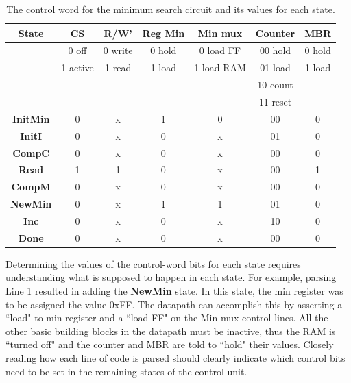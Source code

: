 \begin{table}
\begin{tabular}{c||c|c|c|c|c|c}  
{\bf State}   & CS       & R/W'   &  Reg Min  & Min mux       & Counter & MBR	\\ \hline
        & 0 off    & 0 write&  0 hold   & 0 load FF     & 00 hold & 0 hold	\\ \hline
        & 1 active & 1 read &  1 load   & 1 load RAM    & 01 load & 1 load	\\ \hline
        &          &        &           &               & 10 count& 		\\ \hline
        &          &        &           &               & 11 reset& \\ \hline \hline
{\bf InitMin } & 0        &    x   & 1         & 0             & 00      & 0   \\ \hline
{\bf InitI }  & 0        &    x   & 0         & x             & 01      & 0   \\ \hline
{\bf CompC }  & 0        &    x   & 0         & x             & 00      & 0   \\ \hline
{\bf Read  }  & 1        &    1   & 0         & x             & 00      & 1   \\ \hline
{\bf CompM }  & 0        &    x   & 0         & x             & 00      & 0   \\ \hline
{\bf NewMin }  & 0        &    x   & 1         & 1             & 01      & 0   \\ \hline
{\bf Inc  }   & 0        &    x   & 0         & x             & 10      & 0   \\ \hline
{\bf Done }   & 0        &    x   & 0         & x             & 00      & 0   \\ 
\end{tabular}
\caption{The control word for the minimum search circuit and its values for each state.}
\label{table:MinSearch}
\end{table}

Determining the values of the control-word bits for each state 
requires understanding what is supposed to happen in each 
state.  For example, parsing Line 1 resulted in adding the 
{\bf NewMin} state.  In this state, the min register was
to be assigned the value 0xFF.  The datapath can accomplish
this by asserting a ``load" to min register and a ``load FF" on the 
Min mux control lines.  All the other basic building blocks 
in the datapath must be inactive, thus the RAM is ``turned off"
and the counter and MBR are told to ``hold" their values.
Closely reading how each line of code is parsed should clearly
indicate which control bits need to be set in the remaining states
of the control unit.

